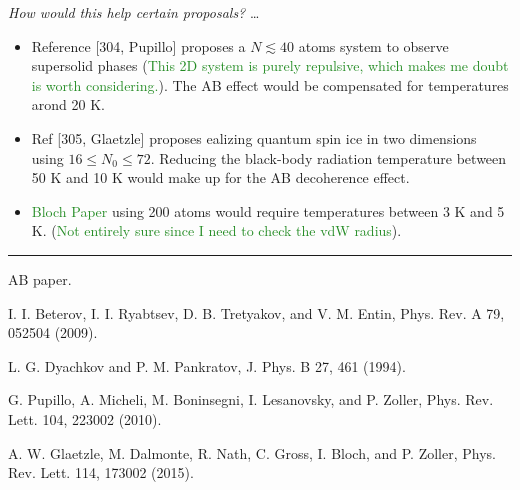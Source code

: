 \documentclass[10pt,twocolumn]{article}
\begin{document}
\textit{How would this help certain proposals?} \ldots

\begin{itemize}
\item Reference [304, Pupillo] proposes a $N \lesssim 40$ atoms system to observe supersolid phases (\textcolor{ForestGreen}{This 2D system is purely repulsive, which makes me doubt is worth considering.}). The AB effect would be compensated for temperatures arond 20 K.
\item Ref [305, Glaetzle] proposes ealizing quantum spin ice in two dimensions using $16 \leq N_0\leq 72$. Reducing the black-body radiation temperature between 50 K and 10 K would make up for the AB decoherence effect.
\item \textcolor{ForestGreen}{Bloch Paper} using 200 atoms would require temperatures between 3 K and 5 K. (\textcolor{ForestGreen}{Not entirely sure since I need to check the vdW radius}).
\end{itemize}



\begin{center}
\rule{4cm}{0.4pt}
\end{center}

\begin{thebibliography}{8}
AB paper.
 
I. I. Beterov, I. I. Ryabtsev, D. B. Tretyakov, and V. M. Entin,
Phys. Rev. A 79, 052504 (2009).

L. G. Dyachkov and P. M. Pankratov, J. Phys. B 27, 461
(1994).

 G. Pupillo, A. Micheli, M. Boninsegni, I. Lesanovsky, and
P. Zoller, Phys. Rev. Lett. 104, 223002 (2010).

  A. W. Glaetzle, M. Dalmonte, R. Nath, C. Gross, I. Bloch, and P. Zoller, Phys. Rev. Lett. 114, 173002 (2015).

\bibitem{}
 
\end{thebibliography}
\end{document}
